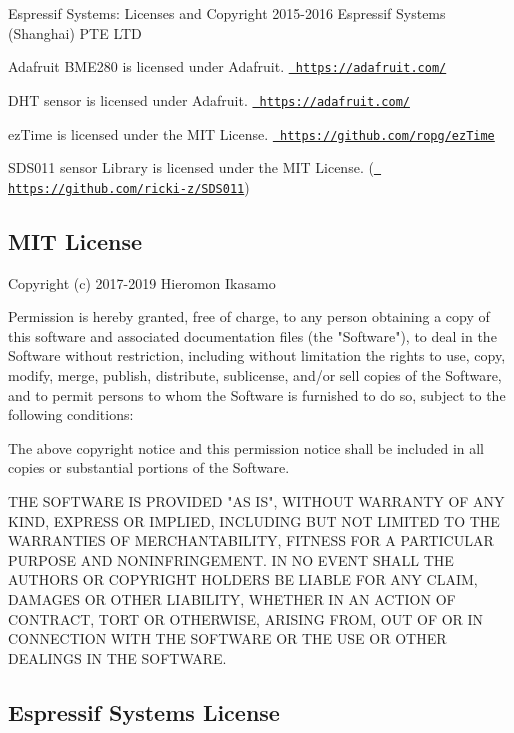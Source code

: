 \begin{DoxyItemize}
\item Espressif Systems\+: Licenses and Copyright 2015-\/2016 Espressif Systems (Shanghai) P\+TE L\+TD
\item Adafruit B\+M\+E280 is licensed under Adafruit. \href{https://adafruit.com/}{\texttt{ https\+://adafruit.\+com/}}
\item D\+HT sensor is licensed under Adafruit. \href{https://adafruit.com/}{\texttt{ https\+://adafruit.\+com/}}
\item ez\+Time is licensed under the M\+IT License. \href{https://github.com/ropg/ezTime}{\texttt{ https\+://github.\+com/ropg/ez\+Time}}
\item S\+D\+S011 sensor Library is licensed under the M\+IT License. (\href{https://github.com/ricki-z/SDS011}{\texttt{ https\+://github.\+com/ricki-\/z/\+S\+D\+S011}})
\end{DoxyItemize}\hypertarget{index_mit}{}\subsection{M\+I\+T License}\label{index_mit}
\begin{DoxyVerb}   Copyright (c) 2017-2019 Hieromon Ikasamo

   Permission is hereby granted, free of charge, to any person obtaining a copy
   of this software and associated documentation files (the "Software"), to deal
   in the Software without restriction, including without limitation the rights
   to use, copy, modify, merge, publish, distribute, sublicense, and/or sell
   copies of the Software, and to permit persons to whom the Software is
   furnished to do so, subject to the following conditions:

   The above copyright notice and this permission notice shall be included in all
   copies or substantial portions of the Software.

   THE SOFTWARE IS PROVIDED "AS IS", WITHOUT WARRANTY OF ANY KIND, EXPRESS OR
   IMPLIED, INCLUDING BUT NOT LIMITED TO THE WARRANTIES OF MERCHANTABILITY,
   FITNESS FOR A PARTICULAR PURPOSE AND NONINFRINGEMENT. IN NO EVENT SHALL THE
   AUTHORS OR COPYRIGHT HOLDERS BE LIABLE FOR ANY CLAIM, DAMAGES OR OTHER
   LIABILITY, WHETHER IN AN ACTION OF CONTRACT, TORT OR OTHERWISE, ARISING FROM,
   OUT OF OR IN CONNECTION WITH THE SOFTWARE OR THE USE OR OTHER DEALINGS IN THE
   SOFTWARE.
\end{DoxyVerb}
\hypertarget{index_EspressifLic}{}\subsection{Espressif Systems License}\label{index_EspressifLic}
